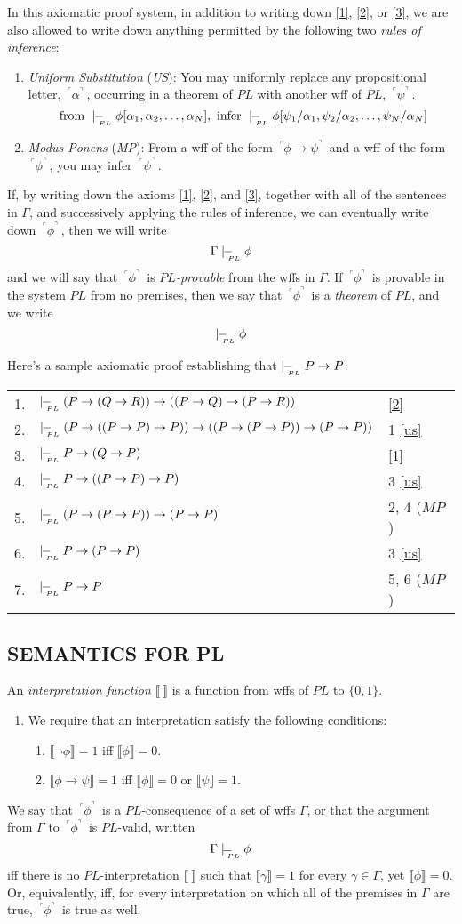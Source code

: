 \documentclass[landscape, two column, full page,reqno]{article}
\newcommand{\qe}{\begin{enumerate}[align=left,style=nextline,leftmargin=17pt,labelsep=5pt,font=\normalfont]}
\newcommand{\ze}{\end{enumerate}}
\newcommand{\p}{\item}
\newcommand{\e}{\emph}
\newcommand{\fns}[1]{{\footnotesize #1}}
\newcommand{\qq}[1]{ ~\!^\ulcorner #1  ^\urcorner~\!}
\newcommand{\V}[1]{\llbracket #1 \rrbracket}
\newcommand{\plmodels}{\models_{\!\!\!\raisebox{-3pt}{\text{\tiny $PL$}}}}
\newcommand{\plproves}{\mid\hspace{-3.9pt}-_{\!\!\!\raisebox{-3pt}{\text{\tiny$PL$}}}\hspace{3pt}}
\begin{document}
In this axiomatic proof system, in addition to writing down \eqref{1}, \eqref{2}, or \eqref{3},  we are also allowed to write down anything permitted by the following two \e{rules of inference}:
		\qe
		\p[] \e{Uniform Substitution} (\e{US}): You may uniformly replace any propositional letter, $\qq{\alpha}$, occurring in a theorem of $PL$ with another wff of $PL$, $\qq{\psi}$.	
				\[
				\text{ from } \plproves \phi[\alpha_1, \alpha_2, \dots, \alpha_N] , \text{ infer } \plproves \phi [\psi_1/\alpha_1, \psi_2/\alpha_2, \dots, \psi_N/\alpha_N]
				\]
		\p[] \e{Modus Ponens} (\e{MP}): From a wff of the form $\qq{\phi \to \psi}$ and a wff of the form $\qq{\phi}$, you may infer $\qq{\psi}$.
		\ze 
\p If, by writing down the axioms \eqref{1}, \eqref{2}, and \eqref{3}, together with all of the sentences in $\Gamma$, and successively applying the rules of inference, we can eventually write down $\qq{\phi}$, then we will write
			\[
			\Gamma \plproves \phi
			\]
and we will say that $\qq{\phi}$ is \e{$PL$-provable} from the wffs in $\Gamma$.  If $\qq{\phi}$ is provable in the system $PL$ from no premises, then we say that $\qq{\phi}$ is a \e{theorem} of $PL$, and we write
			\[
			\plproves \phi
			\]
\p Here's a sample axiomatic proof establishing that $\plproves P \to P$:

\hspace{-20pt}
\begin{tabularx}{319pt}{l X l}
1. & $\plproves (P \to (Q \to R)) \to ((P \to Q) \to (P \to R))$ 					& \eqref{2}	\\
2.& $\plproves (P \to ((P \to P) \to P)) \to ((P \to (P \to P)) \to (P \to P))$			&	1 \eqref{us}	\\
3.& $\plproves P \to (Q \to P)$					&\eqref{1}	\\
4. & $\plproves P \to ((P \to P) \to P)$	& 3 \eqref{us}	\\
5. & $\plproves (P \to (P \to P)) \to (P \to P)$				& 2, 4 ($MP$)\\
6. & $\plproves P \to (P \to P)$							& 3  \eqref{us} \\
7. & $\plproves P \to P$								&5, 6  ($MP$)
\end{tabularx}


\subsection{S\fns{EMANTICS} F\fns{OR} PL}
\p An \e{interpretation function} $\V{~}$ is a function from wffs of $PL$ to $\{ 0, 1 \}$.
	\qe
	\p We require that an interpretation satisfy the following conditions:
			\qe
			\p[($\neg$)] $\V{\neg \phi} = 1$ iff $\V{\phi} = 0$.
			\p[($\to$)] $\V{\phi \to \psi} = 1$ iff $\V{\phi} = 0$ or $\V{\psi} = 1$.
			\ze 
	\ze 
\p We say that $\qq{\phi}$ is a $PL$-consequence of a set of wffs $\Gamma$, or that the argument from $\Gamma$ to $\qq{\phi}$ is $PL$-valid, written
		\[
		\Gamma \plmodels \phi
		\]
iff there is no $PL$-interpretation $\V{~}$ such that $\V{\gamma} =1$ for every $\gamma \in \Gamma$, yet $\V{\phi} = 0$.  Or, equivalently, iff, for every interpretation on which all of the premises in $\Gamma$ are true, $\qq{\phi}$ is true as well.
\end{document}
